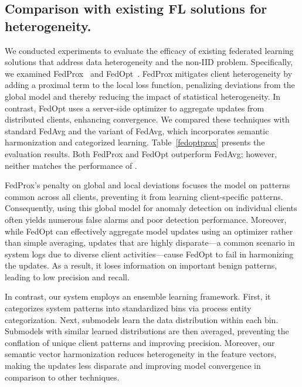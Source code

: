 \subsection{Comparison with existing FL solutions for heterogeneity.}
\label{sec:fedalternatives}


We conducted experiments to evaluate the efficacy of existing federated learning solutions that address data heterogeneity and the non-IID problem. Specifically, we examined FedProx~\cite{li2020federated} and FedOpt~\cite{asad2020fedopt}. FedProx mitigates client heterogeneity by adding a proximal term to the local loss function, penalizing deviations from the global model and thereby reducing the impact of statistical heterogeneity. In contrast, FedOpt uses a server-side optimizer to aggregate updates from distributed clients, enhancing convergence. We compared these techniques with standard FedAvg and the \Sys variant of FedAvg, which incorporates semantic harmonization and categorized learning. Table~\ref{fedoptprox} presents the evaluation results. Both FedProx and FedOpt outperform FedAvg; however, neither matches the performance of \Sys.

FedProx's penalty on global and local deviations focuses the model on patterns common across all clients, preventing it from learning client-specific patterns. Consequently, using this global model for anomaly detection on individual clients often yields numerous false alarms and poor detection performance. Moreover, while FedOpt can effectively aggregate model updates using an optimizer rather than simple averaging, updates that are highly disparate—a common scenario in system logs due to diverse client activities—cause FedOpt to fail in harmonizing the updates. As a result, it loses information on important benign patterns, leading to low precision and recall.

In contrast, our system employs an ensemble learning framework. First, it categorizes system patterns into standardized bins via process entity categorization. Next, \gnnshort submodels learn the data distribution within each bin. Submodels with similar learned distributions are then averaged, preventing the conflation of unique client patterns and improving precision. Moreover, our semantic vector harmonization reduces heterogeneity in the \gnnshort feature vectors, making the updates less disparate and improving model convergence in comparison to other techniques.
 

